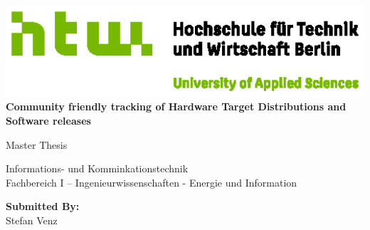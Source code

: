 
\begin{titlepage}
  \begin{center}
	  


	\centering
	\includegraphics[width=15cm]{figures/Q03_HTW_Berlin_Logo_quer_pos_FARBIG_RGB.eps}\\
	\vspace{0.8em}
	\LARGE 
    \sffamily \LARGE \Huge{\textbf{Community friendly tracking of Hardware Target Distributions and Software releases}}

	\vspace{1cm}
	
	\large Master Thesis

    \vspace{1cm}

    \normalsize Informations- und Komminkationstechnik\\
    \normalsize Fachbereich I -- Ingenieurwissenschaften - Energie und Information\\
    
    \vspace{1cm}
    
    \large \textbf{Submitted By:}\\
    \Large Stefan Venz







\end{center}
\end{titlepage}
